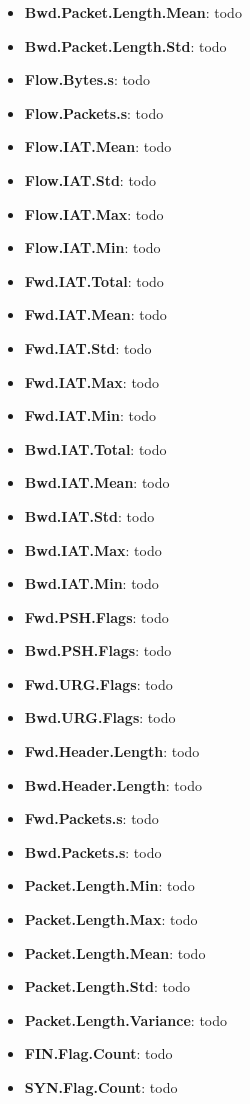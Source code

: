 \begin{itemize}
    \item \textbf{Bwd.Packet.Length.Mean}: todo
    \item \textbf{Bwd.Packet.Length.Std}: todo
    \item \textbf{Flow.Bytes.s}: todo
    \item \textbf{Flow.Packets.s}: todo
    \item \textbf{Flow.IAT.Mean}: todo
    \item \textbf{Flow.IAT.Std}: todo
    \item \textbf{Flow.IAT.Max}: todo
    \item \textbf{Flow.IAT.Min}: todo
    \item \textbf{Fwd.IAT.Total}: todo
    \item \textbf{Fwd.IAT.Mean}: todo
    \item \textbf{Fwd.IAT.Std}: todo
    \item \textbf{Fwd.IAT.Max}: todo
    \item \textbf{Fwd.IAT.Min}: todo
    \item \textbf{Bwd.IAT.Total}: todo
    \item \textbf{Bwd.IAT.Mean}: todo
    \item \textbf{Bwd.IAT.Std}: todo
    \item \textbf{Bwd.IAT.Max}: todo
    \item \textbf{Bwd.IAT.Min}: todo
    \item \textbf{Fwd.PSH.Flags}: todo
    \item \textbf{Bwd.PSH.Flags}: todo
    \item \textbf{Fwd.URG.Flags}: todo
    \item \textbf{Bwd.URG.Flags}: todo
    \item \textbf{Fwd.Header.Length}: todo
    \item \textbf{Bwd.Header.Length}: todo
    \item \textbf{Fwd.Packets.s}: todo
    \item \textbf{Bwd.Packets.s}: todo
    \item \textbf{Packet.Length.Min}: todo
    \item \textbf{Packet.Length.Max}: todo
    \item \textbf{Packet.Length.Mean}: todo
    \item \textbf{Packet.Length.Std}: todo
    \item \textbf{Packet.Length.Variance}: todo
    \item \textbf{FIN.Flag.Count}: todo
    \item \textbf{SYN.Flag.Count}: todo

\end{itemize}
